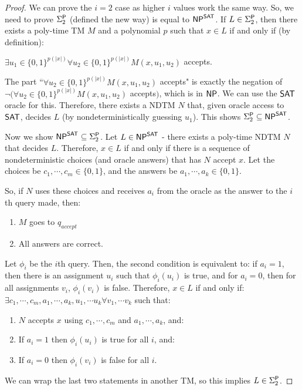 \begin{proof}
We can prove the $i=2$ case as higher $i$ values work the same way. So, we need to prove $\Sigma_2^\P$ (defined the new way) is equal to $\NP^{\SAT}$. If $L \in \Sigma_2^\P$, then there exists a poly-time TM $M$ and a polynomial $p$ such that $x \in L$ if and only if (by definition):
\begin{center}
$\exists u_1 \in \{0, 1\}^{p(|x|)} \forall u_2 \in \{0, 1\}^{p(|x|)} M(x, u_1, u_2)$ accepts.
\end{center}
The part ``$\forall u_2 \in \{0, 1\}^{p(|x|)} M(x, u_1, u_2)$ accepts" is exactly the negation of $\neg (\forall u_2 \in \{0, 1\}^{p(|x|)} M(x, u_1, u_2)$ accepts$)$, which is in $\NP$. We can use the $\SAT$ oracle for this. Therefore, there exists a NDTM $N$ that, given oracle access to $\SAT$, decides $L$ (by nondeterministically guessing $u_1$). This shows $\Sigma_2^\P \subseteq \NP^{\SAT}$.

\par Now we show $\NP^{\SAT} \subseteq \Sigma_2^\P$. Let $L \in \NP^{\SAT}$ - there exists a poly-time NDTM $N$ that decides $L$. Therefore, $x \in L$ if and only if there is a sequence of nondeterministic choices (and oracle answers) that has $N$ accept $x$. Let the choices be $c_1, \cdots, c_m \in \{0, 1\}$, and the answers be $a_1, \cdots, a_k \in \{0, 1\}$.

\par So, if $N$ uses these choices and receives $a_i$ from the oracle as the answer to the $i$th query made, then:
\begin{enumerate}
\item $M$ goes to $q_{accept}$
\item All answers are correct.
\end{enumerate}
Let $\phi_i$ be the $i$th query. Then, the second condition is equivalent to: if $a_i = 1$, then there is an assignment $u_i$ such that $\phi_i(u_i)$ is true, and for $a_i = 0$, then for all assignments $v_i$, $\phi_i(v_i)$ is false. Therefore, $x \in L$ if and only if: $\exists c_1, \cdots, c_m, a_1, \cdots, a_k, u_1, \cdots u_k \forall v_1, \cdots v_k$ such that:
\begin{enumerate}
\item $N$ accepts $x$ using $c_1, \cdots, c_m$ and $a_1, \cdots, a_k$, and:
\item If $a_i = 1$ then $\phi_i(u_i)$ is true for all $i$, and:
\item If $a_i = 0$ then $\phi_i(v_i)$ is false for all $i$.
\end{enumerate}
We can wrap the last two statements in another TM, so this implies $L \in \Sigma_2^\P$.
\end{proof}


